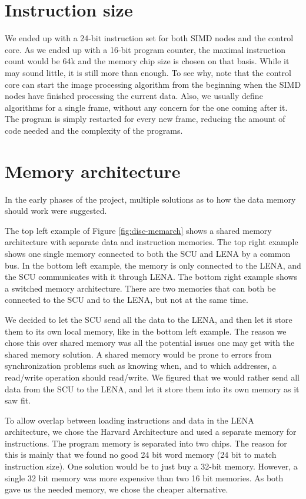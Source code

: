 \section{Instruction size}
We ended up with a 24-bit instruction set for both \ac{SIMD} nodes and the
control core. As we ended up with a 16-bit program counter, the maximal
instruction count would be 64k and the memory chip size is chosen on that
basis. While it may sound little, it is still more than enough. To see why, note
that the control core can start the image processing algorithm from the
beginning when the \ac{SIMD} nodes have finished processing the current data.
Also, we usually define algorithms for a single frame, without any concern for
the one coming after it. The program is simply restarted for every new frame,
reducing the amount of code needed and the complexity of the programs.

\section {Memory architecture}
 

In the early phases of the project, multiple solutions as to how the data memory
should work were suggested. 

The top left example of Figure \ref{fig:disc-memarch} shows a shared memory architecture with separate data and
instruction memories. The top right example shows one single memory connected to
both the SCU and LENA by a common bus. In the bottom left example, the memory is
only connected to the LENA, and the SCU communicates with it through LENA. 
The bottom right example shows a switched memory architecture. There are two memories
that can both be connected to the SCU and to the LENA, but not at the same time.

We decided to let the \ac{SCU} send all the data to
the \ac{LENA}, and then let it store them to its own local memory, like in the bottom left example. The reason we
chose this over shared memory was all the potential issues one may get with the
shared memory solution. A shared memory would be prone to errors from
synchronization problems such as knowing when, and to which addresses, a
read/write operation should read/write. We figured that we would rather send all
data from the \ac{SCU} to the \ac{LENA}, and let it store them into its own
memory as it saw fit.

To allow overlap between loading instructions and data in the LENA architecture,
we chose the Harvard Architecture and used a separate memory for
instructions. The program memory is separated into two chips. The reason for
this is mainly that we found no good 24 bit word memory (24 bit to match instruction
size). One solution would be to just buy a 32-bit memory. However, a single 32 bit
memory was more expensive than two 16 bit memories. As both gave us the needed
memory, we chose the cheaper alternative.

